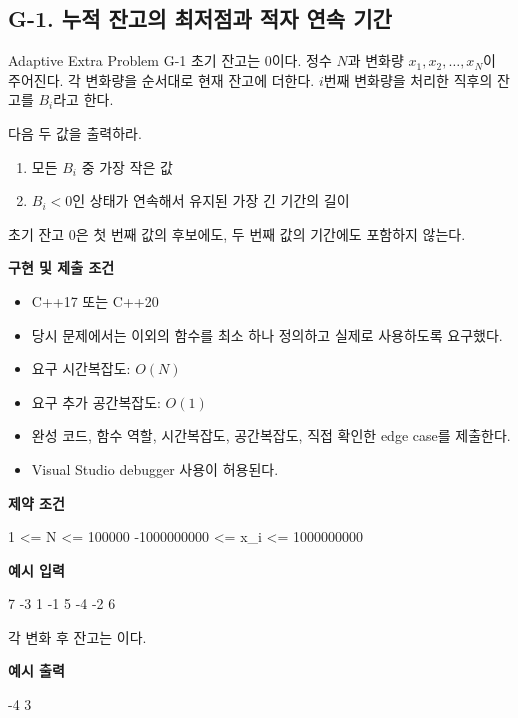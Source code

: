 \subsection{G-1. 누적 잔고의 최저점과 적자 연속 기간}
\begin{problembox}{Adaptive Extra Problem G-1}
초기 잔고는 0이다. 정수 $N$과 변화량 $x_1,x_2,\dots,x_N$이 주어진다. 각 변화량을 순서대로 현재 잔고에 더한다. $i$번째 변화량을 처리한 직후의 잔고를 $B_i$라고 한다.

다음 두 값을 출력하라.
\begin{enumerate}
  \item 모든 $B_i$ 중 가장 작은 값
  \item $B_i<0$인 상태가 연속해서 유지된 가장 긴 기간의 길이
\end{enumerate}
초기 잔고 0은 첫 번째 값의 후보에도, 두 번째 값의 기간에도 포함하지 않는다.

\textbf{구현 및 제출 조건}
\begin{itemize}
  \item C++17 또는 C++20
  \item 당시 문제에서는  이외의 함수를 최소 하나 정의하고 실제로 사용하도록 요구했다.
  \item 요구 시간복잡도: $O(N)$
  \item 요구 추가 공간복잡도: $O(1)$
  \item 완성 코드, 함수 역할, 시간복잡도, 공간복잡도, 직접 확인한 edge case를 제출한다.
  \item Visual Studio debugger 사용이 허용된다.
\end{itemize}

\textbf{제약 조건}
\begin{TextBlock}
1 <= N <= 100000
-1000000000 <= x_i <= 1000000000
\end{TextBlock}

\textbf{예시 입력}
\begin{TextBlock}
7
-3 1 -1 5 -4 -2 6
\end{TextBlock}

각 변화 후 잔고는 이다.

\textbf{예시 출력}
\begin{TextBlock}
-4 3
\end{TextBlock}
\end{problembox}

